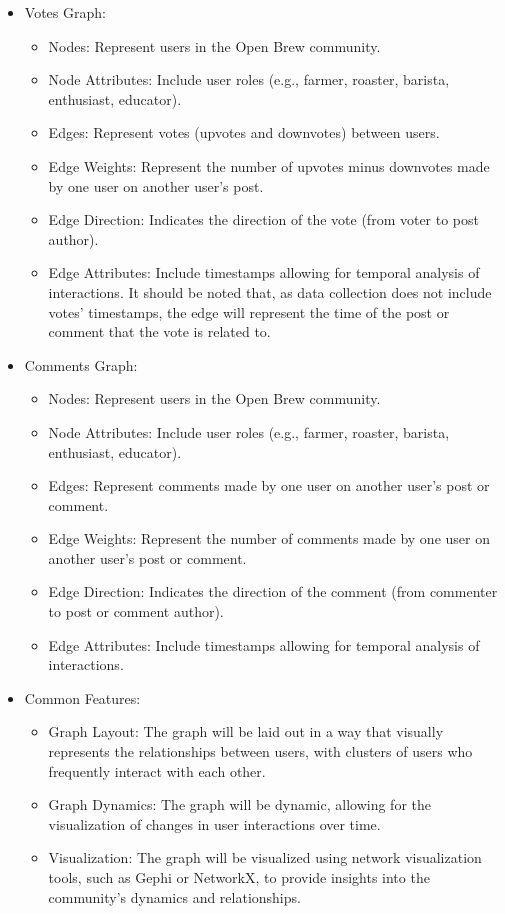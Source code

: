 \documentclass[12pt]{article}
\begin{document}
\begin{itemize}
\item Votes Graph:
    \begin{itemize}
    \item Nodes: Represent users in the Open Brew community.
    \item Node Attributes: Include user roles (e.g., farmer, roaster, barista, enthusiast, educator).
    \item Edges: Represent votes (upvotes and downvotes) between users.
    \item Edge Weights: Represent the number of upvotes minus downvotes made by one user on another user's post.
    \item Edge Direction: Indicates the direction of the vote (from voter to post author).
    \item Edge Attributes: Include timestamps allowing for temporal analysis of interactions. It should be noted that, as data collection does not include votes' timestamps, the edge will represent the time of the post or comment that the vote is related to.
    \end{itemize}

\item Comments Graph:
    \begin{itemize}
    \item Nodes: Represent users in the Open Brew community.
    \item Node Attributes: Include user roles (e.g., farmer, roaster, barista, enthusiast, educator).
    \item Edges: Represent comments made by one user on another user's post or comment.
    \item Edge Weights: Represent the number of comments made by one user on another user's post or comment.
    \item Edge Direction: Indicates the direction of the comment (from commenter to post or comment author).
    \item Edge Attributes: Include timestamps allowing for temporal analysis of interactions.
    \end{itemize}

\item Common Features:
    \begin{itemize}
    \item Graph Layout: The graph will be laid out in a way that visually represents the relationships between users, with clusters of users who frequently interact with each other.
    \item Graph Dynamics: The graph will be dynamic, allowing for the visualization of changes in user interactions over time.
    \item Visualization: The graph will be visualized using network visualization tools, such as Gephi or NetworkX, to provide insights into the community's dynamics and relationships.
    \end{itemize}
\end{itemize}
\end{document}
